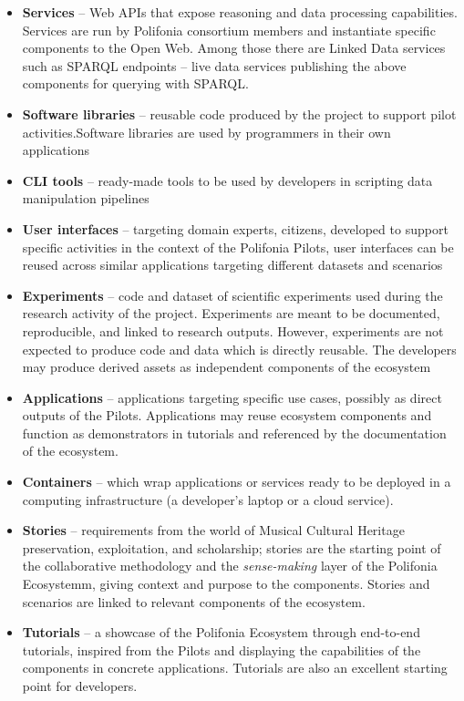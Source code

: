 \begin{itemize}
\item \textbf{Services} -- Web APIs that expose reasoning and data processing capabilities. Services are run by Polifonia consortium members and instantiate specific components to the Open Web. %
Among those there are Linked Data services such as SPARQL endpoints -- live data services publishing the above components for querying with SPARQL.
\item \textbf{Software libraries} -- reusable code produced by the project to support pilot activities.Software libraries are used by programmers in their own applications
\item \textbf{CLI tools} -- ready-made tools to be used by developers in scripting data manipulation pipelines
\item \textbf{User interfaces} -- targeting domain experts, citizens, developed to support specific activities in the context of the Polifonia Pilots, user interfaces can be reused across similar applications targeting different datasets and scenarios
\item \textbf{Experiments} -- code and dataset of scientific experiments used during the research activity of the project. Experiments are meant to be documented, reproducible, and linked to research outputs. However, experiments are not expected to produce code and data which is directly reusable. The developers may produce derived assets as independent components of the ecosystem
\item \textbf{Applications} -- applications targeting specific use cases, possibly as direct outputs of the Pilots. Applications may reuse ecosystem components and function as demonstrators in tutorials and referenced by the documentation of the ecosystem.
\item \textbf{Containers} -- which wrap applications or services ready to be deployed in a computing infrastructure (a developer's laptop or a cloud service).
\item \textbf{Stories} -- requirements from the world of Musical Cultural Heritage preservation, exploitation, and scholarship; stories are the starting point of the collaborative methodology and the \textit{sense-making} layer of the Polifonia Ecosystemm, giving context and purpose to the components. Stories and scenarios are linked to relevant components of the ecosystem.
\item \textbf{Tutorials} -- a showcase of the Polifonia Ecosystem through end-to-end tutorials, inspired from the Pilots and displaying the capabilities of the components in concrete applications. Tutorials are also an excellent starting point for developers.

\end{itemize}
